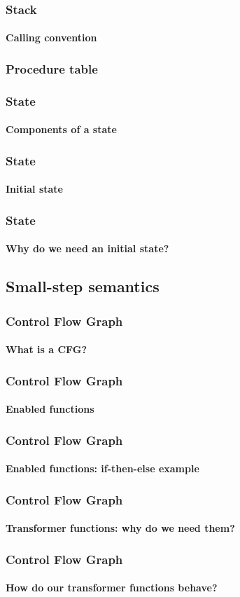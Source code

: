 \begin{frame}
\frametitle{Stack}
\framesubtitle{Calling convention}


\end{frame}


\begin{frame}
\frametitle{Procedure table}
\framesubtitle{}


\end{frame}


\begin{frame}
\frametitle{State}
\framesubtitle{Components of a state}


\end{frame}


\begin{frame}
\frametitle{State}
\framesubtitle{Initial state}


\end{frame}


\begin{frame}
\frametitle{State}
\framesubtitle{Why do we need an initial state?}


\end{frame}


\subsection{Small-step semantics}


\begin{frame}
\frametitle{Control Flow Graph}
\framesubtitle{What is a CFG?}


\end{frame}


\begin{frame}
\frametitle{Control Flow Graph}
\framesubtitle{Enabled functions}


\end{frame}


\begin{frame}
\frametitle{Control Flow Graph}
\framesubtitle{Enabled functions: if-then-else example}


\end{frame}


\begin{frame}
\frametitle{Control Flow Graph}
\framesubtitle{Transformer functions: why do we need them?}


\end{frame}


\begin{frame}
\frametitle{Control Flow Graph}
\framesubtitle{How do our transformer functions behave?}


\end{frame}



